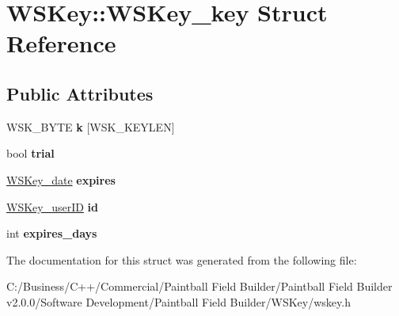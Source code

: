 \hypertarget{struct_w_s_key_1_1_w_s_key__key}{
\section{WSKey::WSKey\_\-key Struct Reference}
\label{struct_w_s_key_1_1_w_s_key__key}
}
\subsection*{Public Attributes}
\begin{DoxyCompactItemize}
\item 
\hypertarget{struct_w_s_key_1_1_w_s_key__key_a872c2a98114081a8c701a6a27e583c5f}{
WSK\_\-BYTE {\bfseries k} \mbox{[}WSK\_\-KEYLEN\mbox{]}}
\label{struct_w_s_key_1_1_w_s_key__key_a872c2a98114081a8c701a6a27e583c5f}

\item 
\hypertarget{struct_w_s_key_1_1_w_s_key__key_a66d9bb07175c105924a4de6c4beb2884}{
bool {\bfseries trial}}
\label{struct_w_s_key_1_1_w_s_key__key_a66d9bb07175c105924a4de6c4beb2884}

\item 
\hypertarget{struct_w_s_key_1_1_w_s_key__key_a98e142e9dd657da9846de0b27f4b7077}{
\hyperlink{struct_w_s_key_1_1_w_s_key__date}{WSKey\_\-date} {\bfseries expires}}
\label{struct_w_s_key_1_1_w_s_key__key_a98e142e9dd657da9846de0b27f4b7077}

\item 
\hypertarget{struct_w_s_key_1_1_w_s_key__key_a70aed0efda5a39cba05fcda31f878df1}{
\hyperlink{struct_w_s_key_1_1_w_s_key__user_i_d}{WSKey\_\-userID} {\bfseries id}}
\label{struct_w_s_key_1_1_w_s_key__key_a70aed0efda5a39cba05fcda31f878df1}

\item 
\hypertarget{struct_w_s_key_1_1_w_s_key__key_adbeae3d3460095ec16dc5019c5c46b0c}{
int {\bfseries expires\_\-days}}
\label{struct_w_s_key_1_1_w_s_key__key_adbeae3d3460095ec16dc5019c5c46b0c}

\end{DoxyCompactItemize}


The documentation for this struct was generated from the following file:\begin{DoxyCompactItemize}
\item 
C:/Business/C++/Commercial/Paintball Field Builder/Paintball Field Builder v2.0.0/Software Development/Paintball Field Builder/WSKey/wskey.h\end{DoxyCompactItemize}
